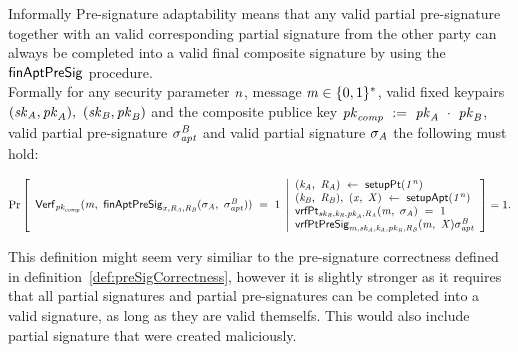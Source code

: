 \begin{definition}
    Informally Pre-signature adaptability means that any valid partial pre-signature together with an valid corresponding partial signature from the other party can
    always be completed into a valid final composite signature by using the $\mathsf{finAptPreSig}$ procedure.\\
    Formally for any security parameter $\mathit{n}$, message $\mathit{m} \in \{0,1\}^{*}$, valid fixed keypairs $(\mathit{sk}_{\mathit{A}}, \mathit{pk}_{\mathit{A}}) ,~ (\mathit{sk}_{\mathit{B}}, \mathit{pk}_{\mathit{B}})$ and the composite publice key $\mathit{pk}_{\mathit{comp}} ~:=~ \mathit{pk}_{\mathit{A}} ~\cdot~ \mathit{pk}_{\mathit{B}}$, valid partial pre-signature $\sigma^{\mathit{B}}_{\mathit{apt}}$ and valid partial signature $\sigma_{\mathit{A}}$ the following must hold:
    \begin{scriptsize}
        \[
            \Pr\left[
            \begin{array}{c}
                \mathsf{Verf}_{\mathit{pk}_{\mathit{comp}}}(\mathit{m} ,~ \mathsf{finAptPreSig}_{\mathit{x},\mathit{R}_{\mathit{A}},\mathit{R}_{\mathit{B}}}(\sigma_{\mathit{A}} ,~ \sigma^{\mathit{B}}_{\mathit{apt}})) ~=~ 1
            \end{array}
            \middle\vert
            \begin{array}{l}
                (\mathit{\mathit{k}_{\mathit{A}}} ,~ \mathit{R}_{\mathit{A}}) ~\leftarrow~ \mathsf{setupPt} (\mathit{1^n}) \\
                (\mathit{\mathit{k}_{\mathit{B}}} ,~ \mathit{R}_{\mathit{B}}) ,~ (\mathit{x} ,~ \mathit{X}) ~\leftarrow~ \mathsf{setupApt}(\mathit{1^n}) \\
                \mathsf{vrfPt}_{\mathit{sk}_{\mathit{B}},\mathit{\mathit{k}_{\mathit{B}}},\mathit{pk}_{\mathit{A}},\mathit{R}_{\mathit{A}}}(\mathit{m} ,~ \sigma_{\mathit{A}}) ~=~ 1 \\
                \mathsf{vrfPtPreSig}_{\mathit{m},\mathit{sk}_{\mathit{A}},\mathit{\mathit{k}_{\mathit{A}}},\mathit{pk}_{\mathit{B}},\mathit{R}_{\mathit{B}}}(\mathit{m} ,~ \mathit{X}){\sigma^{\mathit{B}}_{\mathit{apt}}}
            \end{array}
            \right]=1.
        \]
    \end{scriptsize}
    This definition might seem very similiar to the pre-signature correctness defined in definition~\ref{def:preSigCorrectness}, however it is slightly stronger as it requires that all partial signatures and partial pre-signatures can be completed into a valid signature, as long as they are valid themselfs. This would also include partial signature that were created maliciously.
\end{definition}

